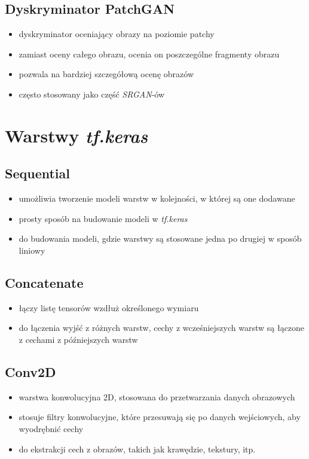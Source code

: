 \documentclass{article}
\begin{document}
\subsection{Dyskryminator PatchGAN}
\begin{itemize}
    \item dyskryminator oceniający obrazy na poziomie patchy
    \item zamiast oceny całego obrazu, ocenia on poszczególne fragmenty obrazu
    \item pozwala na bardziej szczegółową ocenę obrazów
    \item często stosowany jako część \textit{SRGAN}-ów
\end{itemize}
\newpage

\section{Warstwy \textit{tf.keras}}
\subsection{Sequential}
\begin{itemize}
    \item umożliwia tworzenie modeli warstw w kolejności, w której są one dodawane
    \item prosty sposób na budowanie modeli w \textit{tf.keras}
    \item do budowania modeli, gdzie warstwy są stosowane jedna po drugiej w sposób liniowy
\end{itemize}

\subsection{Concatenate}
\begin{itemize}
    \item łączy listę tensorów wzdłuż określonego wymiaru
    \item do łączenia wyjść z różnych warstw, cechy z wcześniejszych warstw są łączone z cechami z późniejszych warstw
\end{itemize}

\subsection{Conv2D}
\begin{itemize}
    \item warstwa konwolucyjna 2D, stosowana do przetwarzania danych obrazowych
    \item stosuje filtry konwolucyjne, które przesuwają się po danych wejściowych, aby wyodrębnić cechy
    \item do ekstrakcji cech z obrazów, takich jak krawędzie, tekstury, itp.
\end{itemize}
\end{document}
